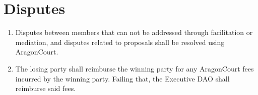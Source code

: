 \section{Disputes}
\begin{enumerate}
	\item Disputes between members that can not be addressed through facilitation or mediation, and disputes related to proposals shall be resolved using \gls{AragonCourt}.
	\item The losing party shall reimburse the winning party for any \gls{AragonCourt} fees incurred by the winning party. Failing that, the Executive \ac{DAO} shall reimburse said fees.
\end{enumerate}
